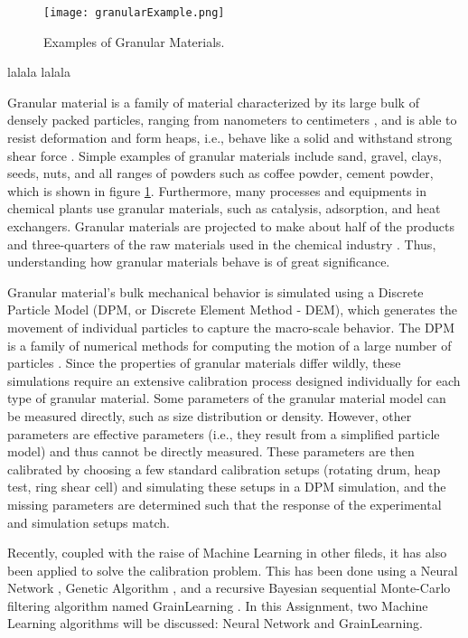 \documentclass[../BachelorAssignment.tex]{subfiles}
\begin{document}
\graphicspath{{\subfix{../Images/}}}

\begin{figure}[H]
    \centering
    \texttt{[image: granularExample.png]}
    \caption{Examples of Granular Materials.\cite{granularExample}}
    \label{fig:granularExample}
\end{figure}


lalala lalala 



Granular material is a family of material characterized by its large bulk of densely packed particles, ranging from nanometers to centimeters \cite{introGranular2}, and is able to resist deformation and form heaps, i.e., behave like a solid and withstand strong shear force \cite{introGranular3}. Simple examples of granular materials include sand, gravel, clays, seeds, nuts, and all ranges of powders such as coffee powder, cement powder, which is shown in figure \ref{fig:granularExample}. Furthermore, many processes and equipments in chemical plants use granular materials, such as catalysis, adsorption, and heat exchangers. Granular materials are projected to make about half of the products and three-quarters of the raw materials used in the chemical industry \cite{introGranular}. Thus, understanding how granular materials behave is of great significance. 


Granular material's bulk mechanical behavior is simulated using a Discrete Particle Model (DPM, or Discrete Element Method - DEM), which generates the movement of individual particles to capture the macro-scale behavior. The DPM is a family of numerical methods for computing the motion of a large number of particles \cite{Weng:2015}. Since the properties of granular materials differ wildly, these simulations require an extensive calibration process designed individually for each type of granular material. Some parameters of the granular material model can be measured directly, such as size distribution or density. However, other parameters are effective parameters (i.e., they result from a simplified particle model) and thus cannot be directly measured. These parameters are then calibrated by choosing a few standard calibration setups (rotating drum, heap test, ring shear cell) and simulating these setups in a DPM simulation, and the missing parameters are determined such that the response of the experimental and simulation setups match. 


Recently, coupled with the raise of Machine Learning in other fileds, it has also been applied to solve the calibration problem. This has been done using a Neural Network \cite{nn-calibration, NN-GA, NN-coarse}, Genetic Algorithm \cite{ga-calibration}, and a recursive Bayesian sequential Monte-Carlo filtering algorithm named GrainLearning \cite{grainLearning}. In this Assignment, two Machine Learning algorithms will be discussed: Neural Network and GrainLearning. 
\end{document}
